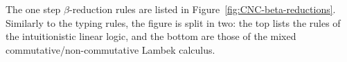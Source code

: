 The one step $\beta$-reduction rules are listed in
Figure~\ref{fig:CNC-beta-reductions}. Similarly to the typing rules,
the figure is split in two: the top lists the rules of the
intuitionistic linear logic, and the bottom are those of the mixed
commutative/non-commutative Lambek calculus. 
\renewcommand{\NDdruleTbetaXXletUName}{}
\renewcommand{\NDdruleTbetaXXletTName}{}
\renewcommand{\NDdruleTbetaXXlamName}{}
\renewcommand{\NDdruleTbetaXXappOneName}{}
\renewcommand{\NDdruleTbetaXXappTwoName}{}
\renewcommand{\NDdruleTbetaXXappLetName}{}
\renewcommand{\NDdruleTbetaXXletLetName}{}
\renewcommand{\NDdruleTbetaXXletAppName}{}
\renewcommand{\NDdruleSbetaXXletUOneName}{}
\renewcommand{\NDdruleSbetaXXletTOneName}{}
\renewcommand{\NDdruleSbetaXXletTTwoName}{}
\renewcommand{\NDdruleSbetaXXletFName}{}
\renewcommand{\NDdruleSbetaXXlamLName}{}
\renewcommand{\NDdruleSbetaXXlamRName}{}
\renewcommand{\NDdruleSbetaXXapplOneName}{}
\renewcommand{\NDdruleSbetaXXapplTwoName}{}
\renewcommand{\NDdruleSbetaXXapprOneName}{}
\renewcommand{\NDdruleSbetaXXapprTwoName}{}
\renewcommand{\NDdruleSbetaXXderelictName}{}
\renewcommand{\NDdruleSbetaXXapplLetName}{}
\renewcommand{\NDdruleSbetaXXapprLetName}{}
\renewcommand{\NDdruleSbetaXXletLetName}{}
\renewcommand{\NDdruleSbetaXXletApplName}{}
\renewcommand{\NDdruleSbetaXXletApprName}{}
\renewcommand{\NDdruleTcomXXunitEXXunitEName}{}
\renewcommand{\NDdruleTcomXXunitEXXtenEName}{}
\renewcommand{\NDdruleTcomXXunitEXXimpEName}{}
\renewcommand{\NDdruleTcomXXtenEXXunitEName}{}
\renewcommand{\NDdruleTcomXXtenEXXtenEName}{}
\renewcommand{\NDdruleTcomXXtenEXXimpEName}{}
\renewcommand{\NDdruleTcomXXimpEXXunitEName}{}
\renewcommand{\NDdruleScomXXunitEXXunitEName}{}
\renewcommand{\NDdruleScomXXunitETwoXXunitEName}{}
\renewcommand{\NDdruleScomXXunitEXXimprEName}{}
\renewcommand{\NDdruleScomXXunitETwoXXimprEName}{}
\renewcommand{\NDdruleScomXXunitEXXFEName}{}
\renewcommand{\NDdruleScomXXunitETwoXXFEName}{}
\renewcommand{\NDdruleScomXXtenEXXunitEName}{}
\renewcommand{\NDdruleScomXXtenETwoXXunitEName}{}
\renewcommand{\NDdruleScomXXtenEXXtenEName}{}
\renewcommand{\NDdruleScomXXtenETwoXXtenEName}{}
\renewcommand{\NDdruleScomXXtenEXXimprEName}{}
\renewcommand{\NDdruleScomXXtenETwoXXimprEName}{}
\renewcommand{\NDdruleScomXXtenEXXimplEName}{}
\renewcommand{\NDdruleScomXXtenETwoXXimplEName}{}
\renewcommand{\NDdruleScomXXtenEXXFEName}{}
\renewcommand{\NDdruleScomXXtenETwoXXFEName}{}
\renewcommand{\NDdruleScomXXFEXXunitEName}{}
\renewcommand{\NDdruleScomXXFEXXtenEName}{}
\renewcommand{\NDdruleScomXXFEXXimprEName}{}
\renewcommand{\NDdruleScomXXFEXXimplEName}{}
\renewcommand{\NDdruleScomXXFEXXFEName}{}

